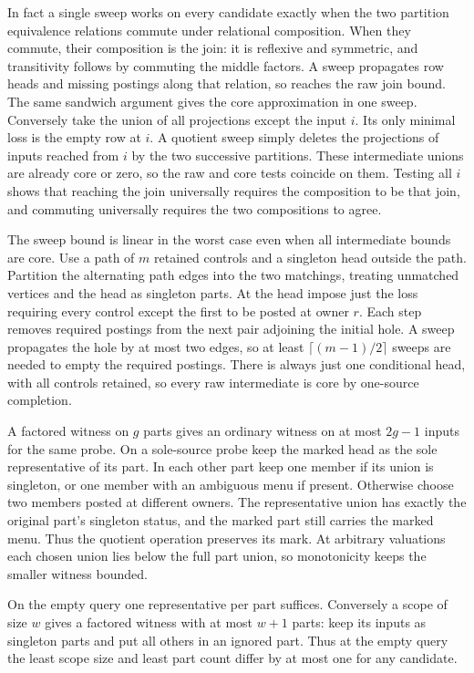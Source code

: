 In fact a single sweep works on every
candidate exactly when the two partition
equivalence relations commute under
relational composition. When they
commute, their composition is the
join: it is reflexive and symmetric,
and transitivity follows by commuting
the middle factors. A sweep propagates
row heads and missing postings along
that relation, so reaches the raw join
bound. The same sandwich argument gives
the core approximation in one sweep.
Conversely take the union of all
projections except the input $i$.
Its only minimal loss is the empty
row at $i$. A quotient sweep simply
deletes the projections of inputs
reached from $i$ by the two successive
partitions. These intermediate unions
are already core or zero, so the raw
and core tests coincide on them.
Testing all $i$ shows that reaching
the join universally requires the
composition to be that join, and
commuting universally requires the
two compositions to agree.

The sweep bound is linear in the
worst case even when all intermediate
bounds are core. Use a path of $m$
retained controls and a singleton
head outside the path. Partition
the alternating path edges into the
two matchings, treating unmatched
vertices and the head as singleton
parts. At the head impose just the
loss requiring every control except
the first to be posted at owner $r$.
Each step removes required postings
from the next pair adjoining the
initial hole. A sweep propagates the
hole by at most two edges, so at
least $\lceil(m-1)/2\rceil$ sweeps
are needed to empty the required
postings. There is always just one
conditional head, with all controls
retained, so every raw intermediate
is core by one-source completion.

A factored witness on $g$ parts gives
an ordinary witness on at most $2g-1$
inputs for the same probe. On a
sole-source probe keep the marked head
as the sole representative of its part.
In each other part keep one member if
its union is singleton, or one member
with an ambiguous menu if present.
Otherwise choose two members posted
at different owners. The representative
union has exactly the original part's
singleton status, and the marked part
still carries the marked menu. Thus the
quotient operation preserves its mark.
At arbitrary valuations each chosen
union lies below the full part union,
so monotonicity keeps the smaller
witness bounded.

On the empty query one representative
per part suffices. Conversely a scope
of size $w$ gives a factored witness
with at most $w+1$ parts: keep its inputs
as singleton parts and put all others
in an ignored part. Thus at the empty
query the least scope size and least
part count differ by at most one for
any candidate.

